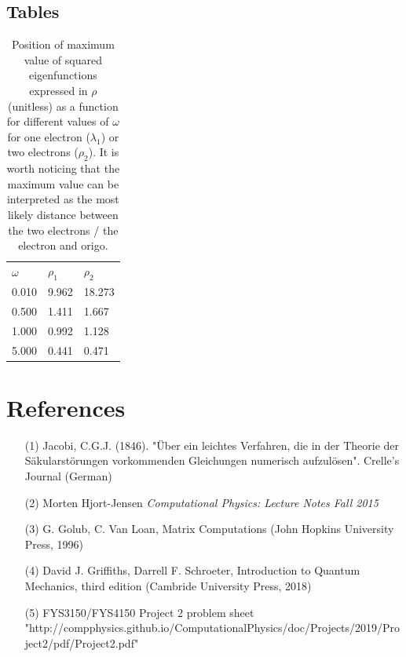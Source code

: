 \documentclass[10pt,a4paper]{article}
\begin{document}
\subsection{Tables}
\begin{table}[H]
\caption[Maximum value of eigenfunctions$^2$]{Position of maximum value of squared eigenfunctions expressed in $\rho$ (unitless) as a function for different values of $\omega$ for one electron ($\lambda_1$) or two electrons ($\rho_2$). It is worth noticing that the maximum value can be interpreted as the most likely distance between the two electrons / the electron and origo.}
\begin{tabular}{lll}
$\omega$ &$\rho_1$ & $\rho_2$  \\
0.010 & 9.962 & 18.273 \\
0.500 &1.411 & 1.667 \\
1.000 &0.992 & 1.128  \\
5.000 &0.441 & 0.471\\
\end{tabular}
\end{table}

\section{References}
\begin{itemize}
\item[(1)] Jacobi, C.G.J. (1846). "Über ein leichtes Verfahren, die in der Theorie der Säkularstörungen vorkommenden Gleichungen numerisch aufzulösen". Crelle's Journal (German)
\item[(2)] Morten Hjort-Jensen \textit{Computational Physics: Lecture Notes Fall 2015}
\item[(3)]G. Golub, C. Van Loan, Matrix Computations (John Hopkins University Press, 1996)
\item[(4)]David J. Griffiths, Darrell F. Schroeter, Introduction to Quantum Mechanics, third edition (Cambride University Press, 2018)
\item[(5)] FYS3150/FYS4150 Project 2 problem sheet "http://compphysics.github.io/ComputationalPhysics/doc/Projects/2019/Project2/pdf/Project2.pdf"
\end{itemize}

\end{document}
